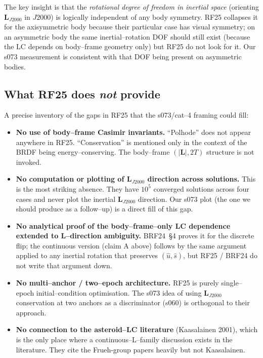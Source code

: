 \documentclass[11pt]{article}
\newcommand{\Lvec}{\mathbf{L}}
\newcommand{\LJ}{\Lvec_{J2000}}
\begin{document}
\noindent
The key insight is that the \emph{rotational degree of freedom in inertial
space} (orienting $\LJ$ in $J2000$) is logically independent of any body
symmetry. RF25 collapses it for the axisymmetric body because their
particular case has visual symmetry; on an asymmetric body the same
inertial--rotation DOF should still exist (because the LC depends on
body--frame geometry only) but RF25 do not look for it. Our s073 measurement
is consistent with that DOF being present on asymmetric bodies.

\subsection{What RF25 does \emph{not} provide}

\noindent
A precise inventory of the gaps in RF25 that the s073/cat--4 framing could
fill:

\begin{itemize}
\item \textbf{No use of body--frame Casimir invariants.} ``Polhode'' does
not appear anywhere in RF25. ``Conservation'' is mentioned only in the
context of the BRDF being energy--conserving. The body--frame
$(|\Lvec|, 2T)$ structure is not invoked.

\item \textbf{No computation or plotting of $\LJ$ direction across solutions.}
This is the most striking absence. They have $10^5$ converged solutions
across four cases and never plot the inertial $\LJ$ direction. Our
s073 plot (the one we should produce as a follow--up) is a direct
fill of this gap.

\item \textbf{No analytical proof of the body--frame--only LC dependence
extended to L--direction ambiguity.} BRF24~\S4 proves it for the
discrete flip; the continuous version (claim A above) follows by the
same argument applied to any inertial rotation that preserves
$(\hat{u}, \hat{s})$, but RF25 / BRF24 do not write that argument down.

\item \textbf{No multi--anchor / two--epoch architecture.} RF25 is purely
single--epoch initial--condition optimisation. The s073 idea of using
$\LJ$ conservation at two anchors as a discriminator (s060) is
orthogonal to their approach.

\item \textbf{No connection to the asteroid--LC literature} (Kaasalainen
2001), which is the only place where a continuous--L--family
discussion exists in the literature. They cite the Frueh-group papers
heavily but not Kaasalainen.
\end{itemize}
\end{document}
